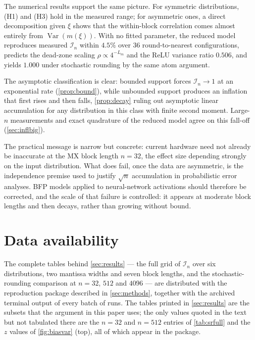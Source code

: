 \documentclass[review,hidelinks,oneeqnum,onetabnum,onefignum,onethmnum]{siamart251216}
\begin{document}
The numerical results support the same picture. For symmetric distributions, (H1)
and (H3) hold in the measured range; for asymmetric ones, a direct decomposition
given $\xi$ shows that the within-block correlation comes almost entirely from
$\operatorname{Var}(m(\xi))$. With no fitted parameter, the reduced model
reproduces measured $\mathcal I_n$ within $4.5\%$ over $36$ round-to-nearest
configurations, predicts the dead-zone scaling $\rho\propto4^{-L_m}$ and the ReLU
variance ratio $0.506$, and yields $1.000$ under stochastic rounding by the same
atom argument.

The asymptotic classification is clear: bounded support forces $\mathcal I_n\to1$
at an exponential rate (\cref{prop:bound}), while unbounded support produces an
inflation that first rises and then falls, \cref{prop:decay} ruling out asymptotic
linear accumulation for any distribution in this class with finite second moment.
Large-$n$ measurements and exact quadrature of the reduced model agree on this
fall-off (\cref{sec:inflbig}).

The practical message is narrow but concrete: current hardware need not already be
inaccurate at the MX block length $n=32$, the effect size depending strongly on
the input distribution. What does fail, once the data are asymmetric, is the
independence premise used to justify $\sqrt n$ accumulation in probabilistic
error analyses. BFP models applied to neural-network activations should therefore
be corrected, and the scale of that failure is controlled: it appears at
moderate block lengths and then decays, rather than growing without bound.

\clearpage
\appendix

\section{Data availability}
\label{app:full}

The complete tables behind \cref{sec:results} — the full grid of
$\mathcal I_n$ over six distributions, two mantissa widths and seven block
lengths, and the stochastic-rounding comparison at $n=32$, $512$ and $4096$ —
are distributed with the reproduction package described in
\cref{sec:methods}, together with the archived terminal output of every batch of
runs. The tables printed in \cref{sec:results} are the subsets that the
argument in this paper uses; the only values quoted in the text but not tabulated
there are the $n=32$ and $n=512$ entries of \cref{tab:srfull} and the
$z$ values of \cref{fig:biasvar} (top), all of which appear in the package.
\end{document}
